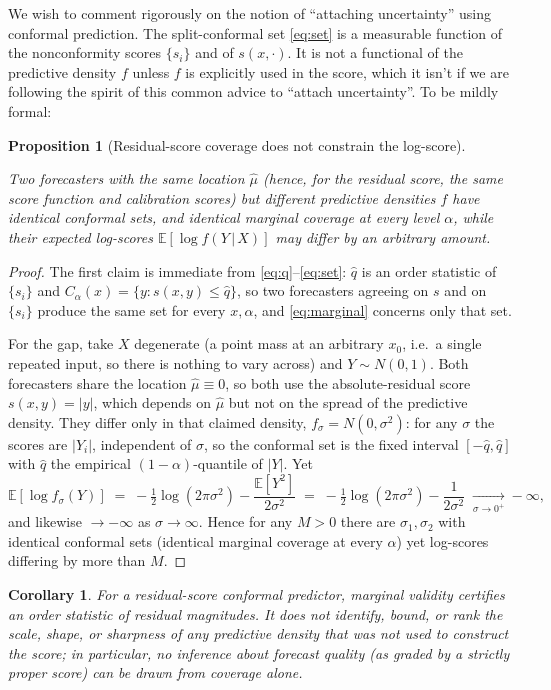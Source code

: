 \documentclass[11pt]{article}
\newtheorem{proposition}{Proposition}
\newtheorem{corollary}{Corollary}
\theoremstyle{definition}
\newcommand{\E}{\mathbb{E}}
\newcommand{\given}{\,\vert\,}
\begin{document}
We wish to comment rigorously on the notion of ``attaching uncertainty'' using conformal prediction.
The split-conformal set \eqref{eq:set} is a measurable function of the nonconformity
scores $\{s_i\}$ and of $s(x,\cdot)$. It is not a functional of the predictive density
$f$ unless $f$ is explicitly used in the score, which it isn't if we are following the spirit of
this common advice to ``attach uncertainty''. To be mildly formal:

\begin{proposition}[Residual-score coverage does not constrain the log-score]\label{prop:orth}

Two forecasters with the
\emph{same} location $\hat\mu$ (hence, for the residual score, the same score function and
calibration scores) but different predictive densities $f$ have \emph{identical} conformal
sets, and identical marginal coverage at every level $\alpha$, while their expected
log-scores $\E[\log f(Y\given X)]$ may differ by an arbitrary amount.
\end{proposition}

\begin{proof}
The first claim is immediate from \eqref{eq:q}--\eqref{eq:set}: $\hat q$ is an order
statistic of $\{s_i\}$ and $C_\alpha(x)=\{y:s(x,y)\le\hat q\}$, so two forecasters
agreeing on $s$ and on $\{s_i\}$ produce the same set for every $x,\alpha$, and
\eqref{eq:marginal} concerns only that set.

For the gap, take $X$ degenerate (a point mass at an arbitrary $x_0$, i.e.\ a single
repeated input, so there is nothing to vary across) and $Y\sim N(0,1)$. Both forecasters
share the location
$\hat\mu\equiv 0$, so both use the absolute-residual score $s(x,y)=|y|$, which depends on
$\hat\mu$ but not on the spread of the predictive density. They differ only in that claimed
density, $f_\sigma=N(0,\sigma^2)$: for any $\sigma$ the scores are $|Y_i|$, independent of
$\sigma$, so the conformal set is the fixed interval $[-\hat q,\hat q]$ with $\hat q$ the
empirical $(1-\alpha)$-quantile of $|Y|$. Yet
\[
  \E[\log f_\sigma(Y)] \;=\; -\tfrac12\log(2\pi\sigma^2)-\frac{\E[Y^2]}{2\sigma^2}
  \;=\; -\tfrac12\log(2\pi\sigma^2)-\frac{1}{2\sigma^2}\;\xrightarrow[\sigma\to 0^+]{}-\infty,
\]
and likewise $\to-\infty$ as $\sigma\to\infty$. Hence for any $M>0$ there are
$\sigma_1,\sigma_2$ with identical conformal sets (identical marginal coverage at every
$\alpha$) yet log-scores differing by more than $M$.
\end{proof}

\begin{corollary}\label{cor:orth}
For a residual-score conformal predictor, marginal validity certifies an order statistic
of residual magnitudes. It does not identify, bound, or rank the scale, shape, or
sharpness of any predictive density that was not used to construct the score; in
particular, no inference about forecast quality (as graded by a strictly proper score)
can be drawn from coverage alone.
\end{corollary}
\end{document}
